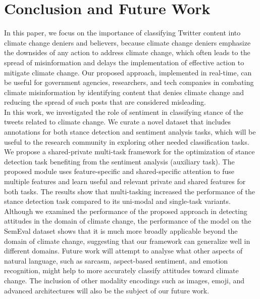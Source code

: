 \documentclass[letterpaper]{article} %
\begin{document}
\section{{Conclusion and Future Work}}
In this paper, we focus on the importance of classifying Twitter content into climate change deniers and believers, because climate change deniers emphasize the downsides of any action to address climate change, which often leads to the spread of misinformation and delays the implementation of effective action to mitigate climate change. Our proposed approach, implemented in real-time, can be useful for government agencies, researchers, and tech companies in combating climate misinformation by identifying content that denies climate change and reducing the spread of such posts that are considered misleading. \\
\noindent In this work, we investigated the role of sentiment in classifying stance of the tweets related to climate change. We curate a novel dataset that includes annotations for both stance detection and sentiment analysis tasks, which will be useful to the research community in exploring other needed classification tasks. We propose a shared-private multi-task framework for the optimization of stance detection task benefiting from the sentiment analysis (auxiliary task). The proposed module uses feature-specific and shared-specific attention to fuse multiple features and learn useful and relevant private and shared features for both tasks. The results show that multi-tasking increased the performance of the stance detection task compared to its uni-modal and single-task variants. Although we examined the performance of the proposed approach in detecting attitudes in the domain of climate change, the performance of the model on the SemEval dataset shows that it is much more broadly applicable beyond the domain of climate change, suggesting that our framework can generalize well in different domains.
Future work will attempt to analyse what other aspects of natural language, such as sarcasm, aspect-based sentiment, and emotion recognition, might help to more accurately classify  attitudes toward climate change. The inclusion of other modality encodings such as images, emoji, and advanced architectures will also be the subject of our future work.
\end{document}
